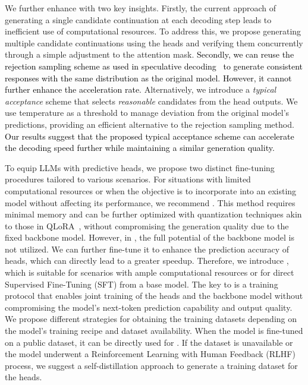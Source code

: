 We further enhance \ours with two key insights. Firstly, the current approach of generating a single candidate continuation at each decoding step leads to inefficient use of computational resources. To address this, we propose generating multiple candidate continuations using the \ours heads and verifying them concurrently through a simple adjustment to the attention mask. 
\textcolor{black}{Secondly, we can reuse the rejection sampling scheme as used in speculative decoding~\cite{leviathan2022fast,chen2023accelerating} to generate consistent responses with the same distribution as the original model. However, it cannot further enhance the acceleration rate.}
Alternatively, we introduce a \emph{typical acceptance} scheme that selects \emph{reasonable} candidates from the \ours head outputs. We use temperature as a threshold to manage deviation from the original model’s predictions, providing an efficient alternative to the rejection sampling method. 
\textcolor{black}{Our results suggest that the proposed typical acceptance scheme can accelerate the decoding speed further while maintaining a similar generation quality.}

To equip LLMs with predictive \ours heads, we propose two distinct fine-tuning procedures tailored to various scenarios. For situations with limited computational resources or when the objective is to incorporate \ours into an existing model without affecting its performance, we recommend . This method requires minimal memory and can be further optimized with quantization techniques akin to those in QLoRA~\citep{dettmers2023qlora}, without compromising the generation quality due to the fixed backbone model. However, in , the full potential of the backbone model is not utilized. We can further fine-tune it to enhance the prediction accuracy of \ours heads, which can directly lead to a greater speedup.
Therefore, we introduce , which is suitable for scenarios with ample computational resources or for direct Supervised Fine-Tuning (SFT) from a base model. 
The key to  is a training protocol that enables joint training of the \ours heads and the backbone model without compromising the model’s next-token prediction capability and output quality.
We propose different strategies for obtaining the training datasets depending on the model’s training recipe and dataset availability. When the model is fine-tuned on a public dataset, it can be directly used for \ours. If the dataset is unavailable or the model underwent a Reinforcement Learning with Human Feedback (RLHF)~\citep{ouyang2022training} process, we suggest a self-distillation approach to generate a training dataset for the \ours heads.

